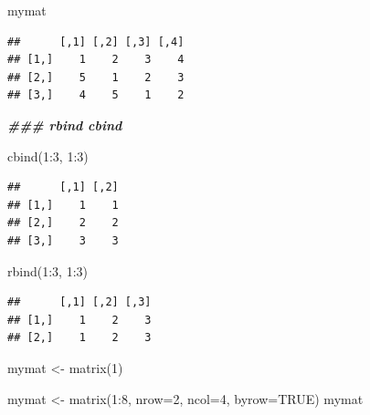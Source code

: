 \documentclass[
]{book}
\newenvironment{Shaded}{\begin{snugshade}}{\end{snugshade}}
\newcommand{\AttributeTok}[1]{\textcolor[rgb]{0.77,0.63,0.00}{#1}}
\newcommand{\ConstantTok}[1]{\textcolor[rgb]{0.00,0.00,0.00}{#1}}
\newcommand{\DecValTok}[1]{\textcolor[rgb]{0.00,0.00,0.81}{#1}}
\newcommand{\DocumentationTok}[1]{\textcolor[rgb]{0.56,0.35,0.01}{\textbf{\textit{#1}}}}
\newcommand{\FunctionTok}[1]{\textcolor[rgb]{0.00,0.00,0.00}{#1}}
\newcommand{\NormalTok}[1]{#1}
\newcommand{\OtherTok}[1]{\textcolor[rgb]{0.56,0.35,0.01}{#1}}
\newcommand{\SpecialCharTok}[1]{\textcolor[rgb]{0.00,0.00,0.00}{#1}}
\begin{document}
\begin{Shaded}
\begin{Highlighting}[]
\NormalTok{mymat}
\end{Highlighting}
\end{Shaded}

\begin{verbatim}
##      [,1] [,2] [,3] [,4]
## [1,]    1    2    3    4
## [2,]    5    1    2    3
## [3,]    4    5    1    2
\end{verbatim}

\begin{Shaded}
\begin{Highlighting}[]
\DocumentationTok{\#\#\# rbind  cbind}

\FunctionTok{cbind}\NormalTok{(}\DecValTok{1}\SpecialCharTok{:}\DecValTok{3}\NormalTok{, }\DecValTok{1}\SpecialCharTok{:}\DecValTok{3}\NormalTok{)}
\end{Highlighting}
\end{Shaded}

\begin{verbatim}
##      [,1] [,2]
## [1,]    1    1
## [2,]    2    2
## [3,]    3    3
\end{verbatim}

\begin{Shaded}
\begin{Highlighting}[]
\FunctionTok{rbind}\NormalTok{(}\DecValTok{1}\SpecialCharTok{:}\DecValTok{3}\NormalTok{, }\DecValTok{1}\SpecialCharTok{:}\DecValTok{3}\NormalTok{)}
\end{Highlighting}
\end{Shaded}

\begin{verbatim}
##      [,1] [,2] [,3]
## [1,]    1    2    3
## [2,]    1    2    3
\end{verbatim}

\begin{Shaded}
\begin{Highlighting}[]
\NormalTok{mymat }\OtherTok{\textless{}{-}} \FunctionTok{matrix}\NormalTok{(}\DecValTok{1}\NormalTok{)}

\NormalTok{mymat }\OtherTok{\textless{}{-}} \FunctionTok{matrix}\NormalTok{(}\DecValTok{1}\SpecialCharTok{:}\DecValTok{8}\NormalTok{, }\AttributeTok{nrow=}\DecValTok{2}\NormalTok{, }\AttributeTok{ncol=}\DecValTok{4}\NormalTok{, }\AttributeTok{byrow=}\ConstantTok{TRUE}\NormalTok{)}
\NormalTok{mymat}
\end{Highlighting}
\end{Shaded}
\end{document}
